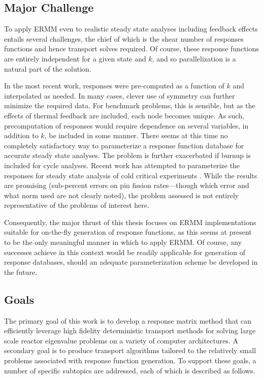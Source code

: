 \subsection{Major Challenge}

To apply ERMM even to realistic steady state analyses including 
feedback effects entails several challenges, the chief of which is 
the shear number of responses functions and hence transport solves 
required.  Of course, these response functions are entirely independent
for a given state and $k$, and so parallelization is a natural part of 
the solution.  

In the most recent work, responses were pre-computed as a function of 
$k$ and interpolated as needed.  In many cases, clever use of symmetry 
can further minimize the required data.  For benchmark problems, this is 
sensible, but as the effects of thermal feedback are included, each 
node becomes unique.  As such, precomputation of responses would require  
dependence on several variables, in addition to $k$, be included in some
manner. There seems 
at this time no completely satisfactory way to parameterize a response 
function database for accurate steady state analyses.  The problem is further 
exacerbated if burnup is included for cycle analyses.  Recent
work has attempted to parameterize the responses for steady state 
analysis of cold critical experiments \cite{hino2012bwr}.  While the results
are promising (sub-percent errors on pin fission rates---though which 
error and what norm used are not clearly noted), the problem assessed is not 
entirely representative of the problems of interest here.  

Consequently, the major thrust of this thesis focuses on ERMM 
implementations suitable for on-the-fly generation of response functions, 
as this seems at present to be the only meaningful manner in which to
apply ERMM.  Of course, any successes achieve in this context 
would be readily applicable for generation of response databases, should 
an adequate parameterization scheme be developed in the future.

\subsection{Goals}

The primary goal of this work is to develop a response matrix method that
can efficiently leverage high fidelity deterministic transport methods for 
solving large scale reactor eigenvalue problems on a variety of computer 
architectures.  A secondary goal is to produce transport algorithms tailored
to the relatively small problems associated with response function 
generation.
To support these goals, a number of specific subtopics are addressed, 
each of which is described as follows.


